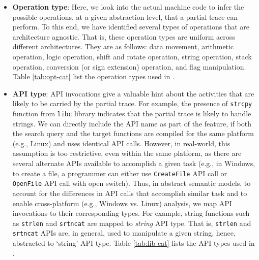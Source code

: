 
\begin{itemize}

\item \textbf{Operation type}: Here, we look into the actual machine code to infer the possible operations, at a given abstraction level, that a partial trace can perform. To this end, we have identified several types of operations that are architecture agnostic. That is, these operation types are uniform across different architectures. They are as follows: data movement, arithmetic operation, logic operation, shift and rotate operation, string operation, 
stack operation, conversion (or sign extension) operation, 
and flag manipulation. Table \ref{tab:opt-cat} list the operation types used in \tool.

\item \textbf{API type}: API invocations give a valuable hint about the activities that are likely to be carried by the partial trace. For example, the presence of \texttt{strcpy} function from \texttt{libc} library indicates that the partial trace is likely to handle strings. We can directly include the API name as part of the feature, if both the search query and the target functions are compiled for the same platform (e.g., Linux) and uses identical API calls. However, in real-world, this assumption is too restrictive, even within the same platform, as there are several alternate APIs available to accomplish a given task  (e.g., in Windows, to create a file, a programmer can either use \texttt{CreateFile} API call or \texttt{OpenFile} API call with open switch).  Thus, in abstract semantic models, to account for the differences in API calls that accomplish similar task and to enable cross-platform (e.g., Windows vs. Linux) analysis, we map API invocations to their corresponding types. For example, string functions such as \texttt{strlen} and \texttt{srtncat} are mapped to \textit{string} API type. That is, \texttt{strlen} and \texttt{srtncat} APIs are, in general, used to manipulate a given string, hence, abstracted to `string' API type. Table \ref{tab:lib-cat} lists the API types used in \tool.
\end{itemize}

